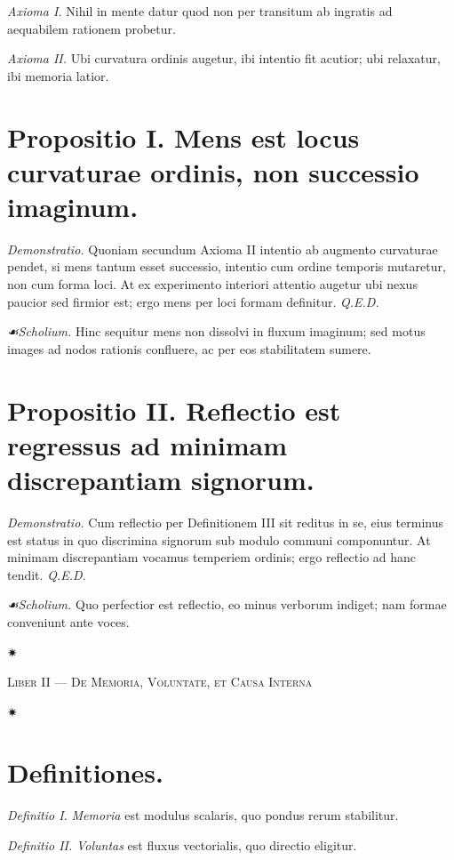 \documentclass[12pt]{article}
\newcommand{\florale}{\centerline{\large ✷}}
\newcommand{\scholia}{\textit{☙\;}}
\newcommand{\divider}{\vspace{1em}\florale\vspace{1em}}
\newcommand{\Liber}[1]{\vspace{1ex}\begin{center}\Large\textsc{Liber #1}\end{center}\vspace{-0.5ex}\florale\vspace{0.5ex}}
\begin{document}
\textit{Axioma I.} \; Nihil in mente datur quod non per transitum ab ingratis ad aequabilem rationem probetur.

\textit{Axioma II.} \; Ubi curvatura ordinis augetur, ibi intentio fit acutior; ubi relaxatur, ibi memoria latior.

\section*{Propositio I. \; Mens est locus curvaturae ordinis, non successio imaginum.}

\textit{Demonstratio.} Quoniam secundum Axioma II intentio ab augmento curvaturae pendet, si mens tantum esset successio, intentio cum ordine temporis mutaretur, non cum forma loci. At ex experimento interiori attentio augetur ubi nexus paucior sed firmior est; ergo mens per loci formam definitur. \textit{Q.E.D.}

\textit{\scholia Scholium.} Hinc sequitur mens non dissolvi in fluxum imaginum; sed motus images ad nodos rationis confluere, ac per eos stabilitatem sumere.

\section*{Propositio II. \; Reflectio est regressus ad minimam discrepantiam signorum.}

\textit{Demonstratio.} Cum reflectio per Definitionem III sit reditus in se, eius terminus est status in quo discrimina signorum sub modulo communi componuntur. At minimam discrepantiam vocamus temperiem ordinis; ergo reflectio ad hanc tendit. \textit{Q.E.D.}

\textit{\scholia Scholium.} Quo perfectior est reflectio, eo minus verborum indiget; nam formae conveniunt ante voces.

\divider

\Liber{II — De Memoria, Voluntate, et Causa Interna}

\section*{Definitiones.}

\textit{Definitio I.} \; \textit{Memoria} est modulus scalaris, quo pondus rerum stabilitur.

\textit{Definitio II.} \; \textit{Voluntas} est fluxus vectorialis, quo directio eligitur.
\end{document}
